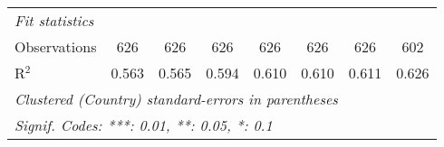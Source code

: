 \begin{tabular}{lccccccc}
   \midrule \emph{Fit statistics}\\
   Observations                                                                          & 626     & 626     & 626           & 626           & 626           & 626           & 602\\  
   R$^2$                                                                                 & 0.563   & 0.565   & 0.594         & 0.610         & 0.610         & 0.611         & 0.626\\  
   \midrule
   \multicolumn{8}{l}{\emph{Clustered (Country) standard-errors in parentheses}}\\
   \multicolumn{8}{l}{\emph{Signif. Codes: ***: 0.01, **: 0.05, *: 0.1}}\\
\end{tabular}
\par\endgroup


